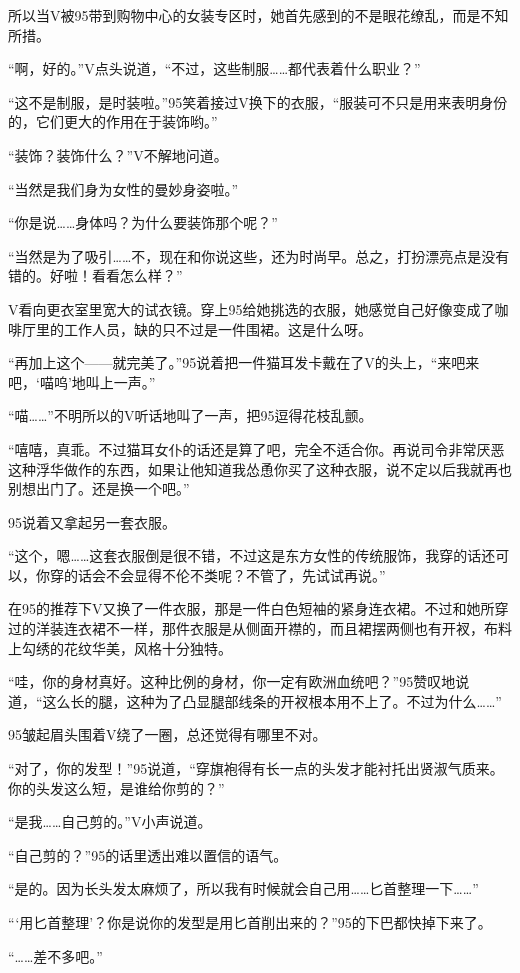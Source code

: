 所以当V被95带到购物中心的女装专区时，她首先感到的不是眼花缭乱，而是不知所措。

“啊，好的。”V点头说道，“不过，这些制服……都代表着什么职业？”

“这不是制服，是时装啦。”95笑着接过V换下的衣服，“服装可不只是用来表明身份的，它们更大的作用在于装饰哟。”

“装饰？装饰什么？”V不解地问道。

“当然是我们身为女性的曼妙身姿啦。”

“你是说……身体吗？为什么要装饰那个呢？”

“当然是为了吸引……不，现在和你说这些，还为时尚早。总之，打扮漂亮点是没有错的。好啦！看看怎么样？”

V看向更衣室里宽大的试衣镜。穿上95给她挑选的衣服，她感觉自己好像变成了咖啡厅里的工作人员，缺的只不过是一件围裙。这是什么呀。

“再加上这个——就完美了。”95说着把一件猫耳发卡戴在了V的头上，“来吧来吧，‘喵呜’地叫上一声。”

“喵……”不明所以的V听话地叫了一声，把95逗得花枝乱颤。

“嘻嘻，真乖。不过猫耳女仆的话还是算了吧，完全不适合你。再说司令非常厌恶这种浮华做作的东西，如果让他知道我怂恿你买了这种衣服，说不定以后我就再也别想出门了。还是换一个吧。”

95说着又拿起另一套衣服。

“这个，嗯……这套衣服倒是很不错，不过这是东方女性的传统服饰，我穿的话还可以，你穿的话会不会显得不伦不类呢？不管了，先试试再说。”

在95的推荐下V又换了一件衣服，那是一件白色短袖的紧身连衣裙。不过和她所穿过的洋装连衣裙不一样，那件衣服是从侧面开襟的，而且裙摆两侧也有开衩，布料上勾绣的花纹华美，风格十分独特。

“哇，你的身材真好。这种比例的身材，你一定有欧洲血统吧？”95赞叹地说道，“这么长的腿，这种为了凸显腿部线条的开衩根本用不上了。不过为什么……”

95皱起眉头围着V绕了一圈，总还觉得有哪里不对。

“对了，你的发型！”95说道，“穿旗袍得有长一点的头发才能衬托出贤淑气质来。你的头发这么短，是谁给你剪的？”

“是我……自己剪的。”V小声说道。

“自己剪的？”95的话里透出难以置信的语气。

“是的。因为长头发太麻烦了，所以我有时候就会自己用……匕首整理一下……”

“‘用匕首整理’？你是说你的发型是用匕首削出来的？”95的下巴都快掉下来了。

“……差不多吧。”

